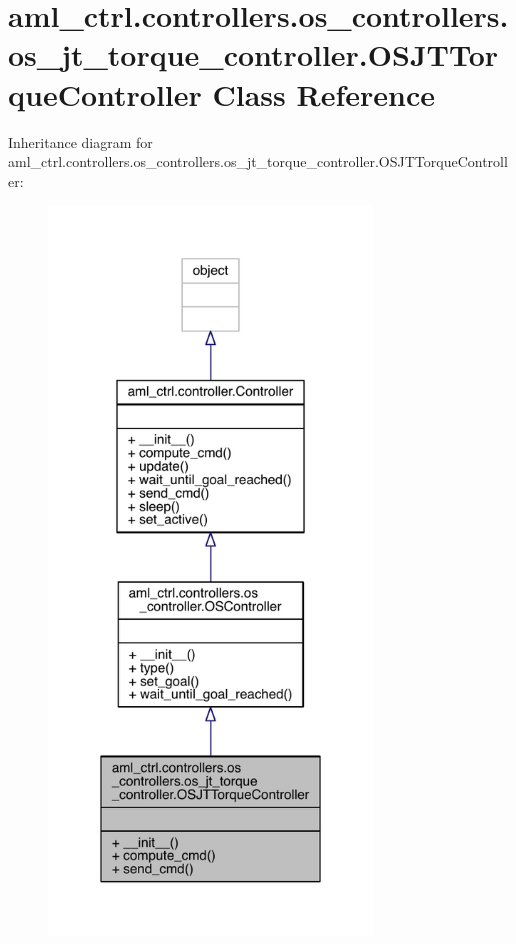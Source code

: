\hypertarget{classaml__ctrl_1_1controllers_1_1os__controllers_1_1os__jt__torque__controller_1_1_o_s_j_t_torque_controller}{}\section{aml\+\_\+ctrl.\+controllers.\+os\+\_\+controllers.\+os\+\_\+jt\+\_\+torque\+\_\+controller.\+O\+S\+J\+T\+Torque\+Controller Class Reference}
\label{classaml__ctrl_1_1controllers_1_1os__controllers_1_1os__jt__torque__controller_1_1_o_s_j_t_torque_controller}


Inheritance diagram for aml\+\_\+ctrl.\+controllers.\+os\+\_\+controllers.\+os\+\_\+jt\+\_\+torque\+\_\+controller.\+O\+S\+J\+T\+Torque\+Controller\+:\nopagebreak
\begin{figure}[H]
\begin{center}
\leavevmode
\includegraphics[width=244pt]{classaml__ctrl_1_1controllers_1_1os__controllers_1_1os__jt__torque__controller_1_1_o_s_j_t_torque_controller__inherit__graph}
\end{center}
\end{figure}


